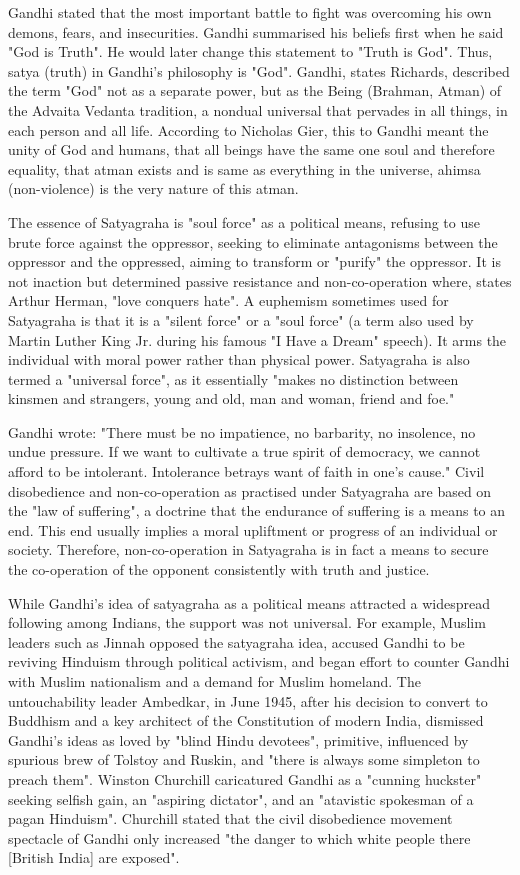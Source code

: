 Gandhi stated that the most important battle to fight was overcoming his
own demons, fears, and insecurities. Gandhi summarised his beliefs first
when he said "God is Truth". He would later change this statement to
"Truth is God". Thus, satya (truth) in Gandhi's philosophy is "God".
Gandhi, states Richards, described the term "God" not as a separate
power, but as the Being (Brahman, Atman) of the Advaita Vedanta
tradition, a nondual universal that pervades in all things, in each
person and all life. According to Nicholas Gier, this to Gandhi meant
the unity of God and humans, that all beings have the same one soul and
therefore equality, that atman exists and is same as everything in the
universe, ahimsa (non-violence) is the very nature of this atman.

The essence of Satyagraha is "soul force" as a political means, refusing
to use brute force against the oppressor, seeking to eliminate
antagonisms between the oppressor and the oppressed, aiming to transform
or "purify" the oppressor. It is not inaction but determined passive
resistance and non-co-operation where, states Arthur Herman, "love
conquers hate". A euphemism sometimes used for Satyagraha is that it is
a "silent force" or a "soul force" (a term also used by Martin Luther
King Jr. during his famous "I Have a Dream" speech). It arms the
individual with moral power rather than physical power. Satyagraha is
also termed a "universal force", as it essentially "makes no distinction
between kinsmen and strangers, young and old, man and woman, friend and
foe."

Gandhi wrote: "There must be no impatience, no barbarity, no insolence,
no undue pressure. If we want to cultivate a true spirit of democracy,
we cannot afford to be intolerant. Intolerance betrays want of faith in
one's cause." Civil disobedience and non-co-operation as practised under
Satyagraha are based on the "law of suffering", a doctrine that the
endurance of suffering is a means to an end. This end usually implies a
moral upliftment or progress of an individual or society. Therefore,
non-co-operation in Satyagraha is in fact a means to secure the
co-operation of the opponent consistently with truth and justice.

While Gandhi's idea of satyagraha as a political means attracted a
widespread following among Indians, the support was not universal. For
example, Muslim leaders such as Jinnah opposed the satyagraha idea,
accused Gandhi to be reviving Hinduism through political activism, and
began effort to counter Gandhi with Muslim nationalism and a demand for
Muslim homeland. The untouchability leader Ambedkar, in June 1945, after
his decision to convert to Buddhism and a key architect of the
Constitution of modern India, dismissed Gandhi's ideas as loved by
"blind Hindu devotees", primitive, influenced by spurious brew of
Tolstoy and Ruskin, and "there is always some simpleton to preach them".
Winston Churchill caricatured Gandhi as a "cunning huckster" seeking
selfish gain, an "aspiring dictator", and an "atavistic spokesman of a
pagan Hinduism". Churchill stated that the civil disobedience movement
spectacle of Gandhi only increased "the danger to which white people
there {[}British India{]} are exposed".

